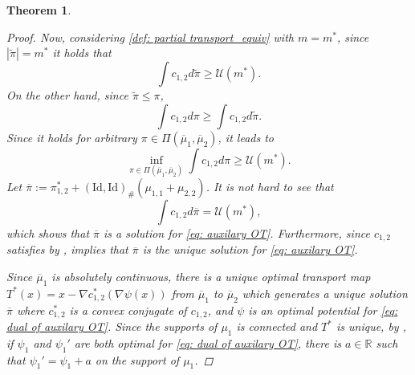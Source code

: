 \documentclass{amsart}
\theoremstyle{plain}
\numberwithin{equation}{section}\newtheorem{theorem}{Theorem}[section]
\theoremstyle{remark}
\begin{document}
\begin{theorem}
\begin{proof}
Now, considering \eqref{def: partial transport_equiv} with $m=m^*$, since $|\tilde{\pi}|=m^*$ it holds that
\[
    \int c_{1,2} d\tilde{\pi} \geq \mathcal{U}(m^*).
\]
On the other hand, since $\tilde{\pi} \leq \pi$, 
\[
    \int c_{1,2} d\pi \geq \int c_{1,2} d\tilde{\pi}.
\]
Since it holds for arbitrary $\pi \in \Pi(\overline{\mu}_1, \overline{\mu}_2)$, it leads to
\[
    \inf_{\pi \in \Pi(\overline{\mu}_1, \overline{\mu}_2)} \int c_{1,2} d\pi \geq \mathcal{U}(m^*).
\]
Let $\overline{\pi} := \pi^*_{1,2} +(\mathrm{Id}, \mathrm{Id})_\#(\mu_{1,1} + \mu_{2,2})$. It is not hard to see that
\begin{equation}\label{eq: auxilary OT = partial OT equiv}
    \int c_{1,2} d\overline{\pi} = \mathcal{U}(m^*),
\end{equation}
which shows that $\overline{\pi}$ is a solution for \eqref{eq: auxilary OT}. Furthermore, since $c_{1,2}$ satisfies  by , \cite[Theorem 2.4]{CLT_general_transport2024} implies that $\overline{\pi}$ is the unique solution for \eqref{eq: auxilary OT}.




Since $\overline{\mu}_1$ is absolutely continuous, there is a unique optimal transport map $T^*(x) = x - \nabla c_{1,2}^* (\nabla \psi (x))$ from $\overline{\mu}_1$ to $\overline{\mu}_2$ which generates a unique solution $\overline{\pi}$ where $c_{1,2}^*$ is a convex conjugate of $c_{1,2}$, and $\psi$ is an optimal potential for \eqref{eq: dual of auxilary OT}. Since the supports of $\mu_1$ is connected and $T^*$ is unique, by , if $\psi_1$ and $\psi_1'$ are both optimal for \eqref{eq: dual of auxilary OT}, there is $a \in \mathbb{R}$ such that $\psi_1' = \psi_1 + a$ on the support of $\mu_1$. 






\end{proof}
\end{theorem}
\end{document}
